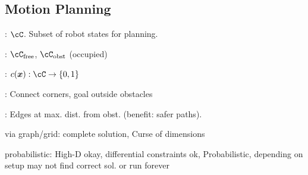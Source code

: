 \subsection{Motion Planning}
: $\cC$. Subset of robot states for planning.

: $\cC_{\text{free}}$,  $\cC_\text{obst}$ (occupied)

: $c(\vec{x}) : \cC \rightarrow \{ 0, 1 \}$

: Connect corners, goal outside obstacles

: Edges at max. dist. from obst. (benefit: safer paths).

 {\scriptsize via graph/grid}: {\color{ForestGreen} complete solution}, {\color{red} Curse of dimensions}

 {\scriptsize probabilistic}: {\color{ForestGreen} High-D okay, differential constraints ok},
{\color{red} Probabilistic, depending on setup may not find correct sol. or run forever}
